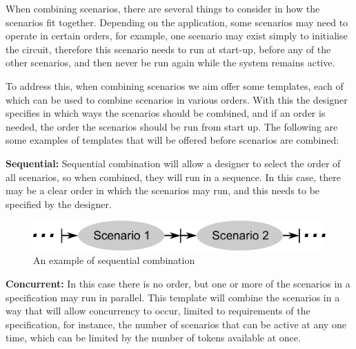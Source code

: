 \documentclass[british,compsoc]{IEEEtran}
\begin{document}
When combining scenarios, there are several things to consider in
how the scenarios fit together. Depending on the application,
some scenarios may need to operate in certain
orders, for example, one scenario may exist simply to initialise the
circuit, therefore this scenario needs to run at start-up, before
any of the other scenarios, and then never be run again while the
system remains active.

To address this, when combining scenarios we aim offer some templates,
each of which can be used to combine scenarios in various orders.
With this the designer specifies in which ways the scenarios should
be combined, and if an order is needed, the order the scenarios should
be run from start up. The following are some examples of templates
that will be offered before scenarios are combined:

\textbf{Sequential:} Sequential combination will allow a designer
to select the order of all scenarios, so when combined, they will
run in a sequence. In this case, there may be a clear order in which
the scenarios may run, and this needs to be specified by the designer.

\begin{figure}[h]
\begin{centering}
\includegraphics[scale=0.45]{Images/sequential_combination}
\par\end{centering}

\begin{centering}
\protect\caption{\label{fig:sequential_combination}An example of sequential combination}

\par\end{centering}

\end{figure}

\textbf{Concurrent:} In this case there is no order, but one or more
of the scenarios in a specification may run in parallel. This template
will combine the scenarios in a way that will allow concurrency to
occur, limited to requirements of the specification, for instance,
the number of scenarios that can be active at any one time, which
can be limited by the number of tokens available at once.
\end{document}
